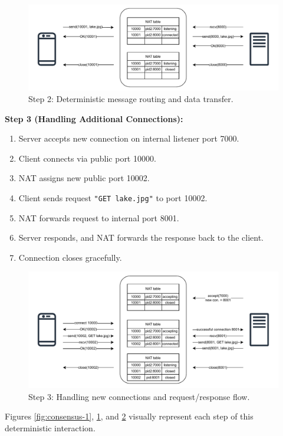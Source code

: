 \documentclass[10pt, 
]{IEEEtran}
\begin{document}
\begin{figure}[h]
\centering
\includegraphics[width=0.9\linewidth]{consensus_diagram_2.pdf}
\caption{Step 2: Deterministic message routing and data transfer.}
\label{fig:consensus-2}
\end{figure}

\textbf{Step 3 (Handling Additional Connections):}
\begin{enumerate}
\item Server accepts new connection on internal listener port 7000.
\item Client connects via public port 10000.
\item NAT assigns new public port 10002.
\item Client sends request \texttt{"GET lake.jpg"} to port 10002.
\item NAT forwards request to internal port 8001.
\item Server responds, and NAT forwards the response back to the client.
\item Connection closes gracefully.
\end{enumerate}

\begin{figure}[h]
\centering
\includegraphics[width=0.9\linewidth]{consensus_diagram_3.pdf}
\caption{Step 3: Handling new connections and request/response flow.}
\label{fig:consensus-3}
\end{figure}

Figures \ref{fig:consensus-1}, \ref{fig:consensus-2}, and \ref{fig:consensus-3} visually represent each step of this deterministic interaction.
\end{document}
